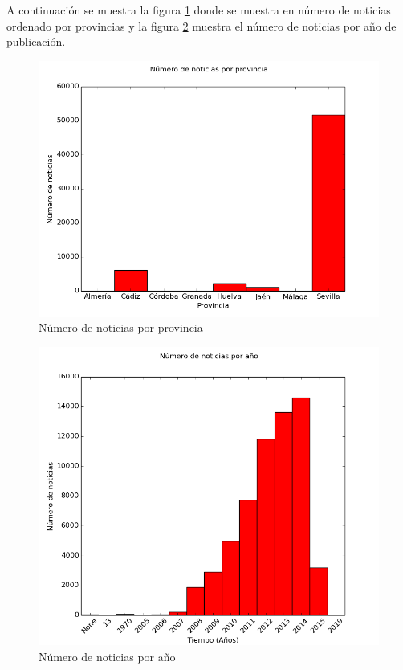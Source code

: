 A continuación se muestra la figura \ref{fig:noti_provincia} donde se muestra en número de noticias ordenado por provincias y la figura \ref{fig:noti_year} muestra el número de noticias por año de publicación.
\begin{center}
\begin{figure}[h]
\centering
\includegraphics[scale=0.65]{Extraccion/imagenes/histograma_provincias.png}
\caption{Número de noticias por provincia}
\label{fig:noti_provincia}
\end{figure}
\end{center}
%
%
%
\begin{center}
\begin{figure}[h]
\centering
\includegraphics[scale=0.6]{Extraccion/imagenes/histograma_year.png}
\caption{Número de noticias por año}
\label{fig:noti_year}
\end{figure}
\end{center}

